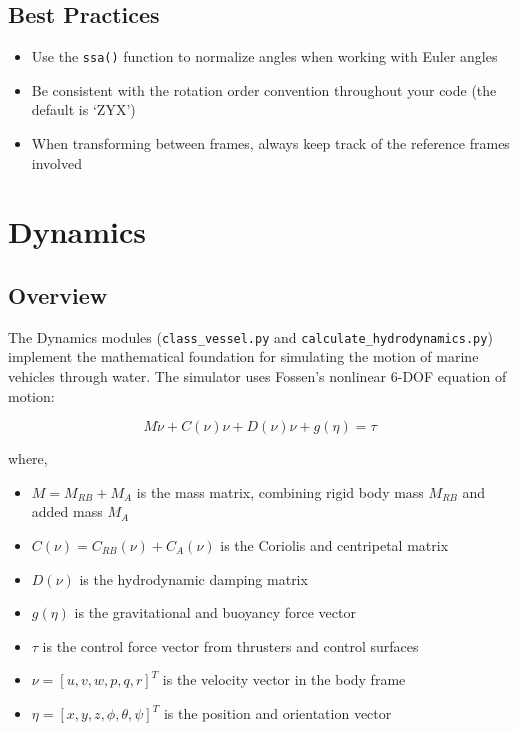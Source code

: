 \documentclass[
  letterpaper,
  DIV=11,
  numbers=noendperiod]{scrreprt}
\providecommand{\tightlist}{%
  \setlength{\itemsep}{0pt}\setlength{\parskip}{0pt}}\usepackage{longtable,booktabs,array}
\begin{document}
\section*{Best Practices}\label{best-practices}


\begin{itemize}
\tightlist
\item
  Use the \texttt{ssa()} function to normalize angles when working with
  Euler angles
\item
  Be consistent with the rotation order convention throughout your code
  (the default is `ZYX')
\item
  When transforming between frames, always keep track of the reference
  frames involved
\end{itemize}


\chapter*{Dynamics}\label{dynamics}


\section*{Overview}\label{overview-2}


The Dynamics modules (\texttt{class\_vessel.py} and
\texttt{calculate\_hydrodynamics.py}) implement the mathematical
foundation for simulating the motion of marine vehicles through water.
The simulator uses Fossen's nonlinear 6-DOF equation of motion:

\[M\dot{\nu}+C(\nu)\nu+D(\nu)\nu+g(\eta) = \tau\]

where,

\begin{itemize}
\tightlist
\item
  \(M = M_{RB} + M_A\) is the mass matrix, combining rigid body mass
  \(M_{RB}\) and added mass \(M_A\)
\item
  \(C(\nu) = C_{RB}(\nu) + C_A(\nu)\) is the Coriolis and centripetal
  matrix
\item
  \(D(\nu)\) is the hydrodynamic damping matrix
\item
  \(g(\eta)\) is the gravitational and buoyancy force vector
\item
  \(\tau\) is the control force vector from thrusters and control
  surfaces
\item
  \(\nu = [u, v, w, p, q, r]^T\) is the velocity vector in the body
  frame
\item
  \(\eta = [x, y, z, \phi, \theta, \psi]^T\) is the position and
  orientation vector
\end{itemize}
\end{document}
